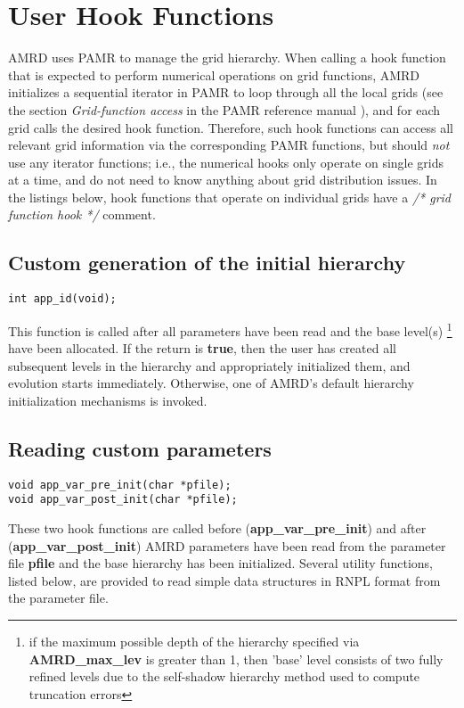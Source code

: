 \documentclass[aps,amssymb,unsortedaddress,nofootinbib]{revtex4}
\begin{document}
\section{User Hook Functions}\label{sec_hook}

AMRD uses PAMR to manage the grid hierarchy. When calling a hook function
that is expected to perform numerical operations on grid functions, AMRD initializes
a sequential iterator in PAMR to loop through all the local grids (see the section
{\em Grid-function access} in the PAMR reference manual \cite{pamr}), and
for each grid calls the desired hook function. Therefore, such hook functions
can access all relevant grid information via the corresponding PAMR functions,
but should {\em not} use any iterator functions; i.e., the numerical hooks
only operate on single grids at a time, and do not need to know 
anything about grid distribution issues.
In the listings below, hook functions that operate on individual grids
have a {\em /* grid function hook */} comment.

\subsection{Custom generation of the initial hierarchy}

\begin{verbatim}
int app_id(void);
\end{verbatim}

This function is called after all parameters have been read
and the base level(s) \footnote{if the maximum possible 
depth of the hierarchy specified via {\bf AMRD\_max\_lev} is greater than 1,
then 'base' level consists of two fully refined levels due to
the self-shadow hierarchy method used to compute truncation errors}
have been allocated.
If the return is {\bf true}, then the user has created all subsequent
levels in the hierarchy and appropriately initialized them, 
and evolution starts immediately. Otherwise, one of AMRD's default
hierarchy initialization mechanisms is invoked.

\subsection{Reading custom parameters}

\begin{verbatim}
void app_var_pre_init(char *pfile);
void app_var_post_init(char *pfile);
\end{verbatim}

These two hook functions are called before ({\bf app\_var\_pre\_init})
and after ({\bf app\_var\_post\_init}) AMRD parameters have
been read from the parameter file {\bf pfile} and the base hierarchy 
has been initialized. Several utility functions, listed below, 
are provided to read simple data structures in RNPL format \cite{rnpl} 
from the parameter file.
\end{document}
